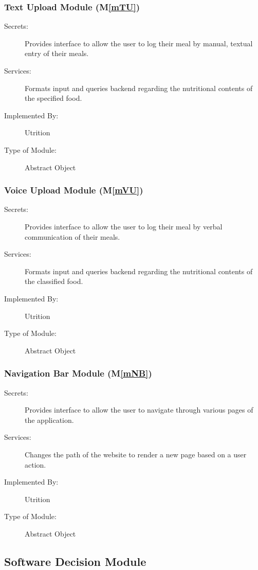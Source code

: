 \documentclass[12pt, titlepage]{article}
\newcommand{\mref}[1]{M\ref{#1}}
\begin{document}
\subsubsection{Text Upload Module (\mref{mTU})}

\begin{description}
	\item[Secrets:]Provides interface to allow the user to log their meal by manual, textual 
	entry of their meals.
	\item[Services:]Formats input and queries backend regarding the nutritional 
	contents of the specified food.
	\item[Implemented By:] Utrition
	\item[Type of Module:] Abstract Object
\end{description}

\subsubsection{Voice Upload Module (\mref{mVU})}

\begin{description}
	\item[Secrets:]Provides interface to allow the user to log their meal by verbal 
	communication of their meals.
	\item[Services:]Formats input and queries backend regarding the nutritional 
	contents of the classified food.
	\item[Implemented By:] Utrition
	\item[Type of Module:] Abstract Object
\end{description}

\subsubsection{Navigation Bar Module (\mref{mNB})}

\begin{description}
	\item[Secrets:]Provides interface to allow the user to navigate through various 
	pages of the application.
	\item[Services:]Changes the path of the website to render a new page based on a 
	user action.
	\item[Implemented By:] Utrition
	\item[Type of Module:] Abstract Object
\end{description}

\subsection{Software Decision Module}
\end{document}

